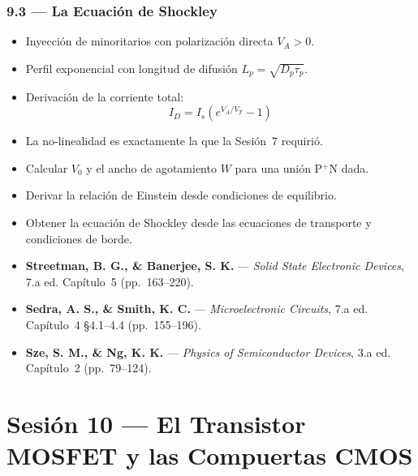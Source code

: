 \documentclass[11pt, letterpaper]{article}
\begin{document}
\subsubsection{9.3 --- La Ecuaci\'on de Shockley}
\begin{itemize}
  \item Inyecci\'on de minoritarios con polarizaci\'on directa $V_A>0$.
  \item Perfil exponencial con longitud de difusi\'on $L_p=\sqrt{D_p\tau_p}$.
  \item Derivaci\'on de la corriente total:
    \[I_D=I_s\left(e^{V_A/V_T}-1\right)\]
  \item La no-linealidad es exactamente la que la Sesi\'on~7 requiri\'o.
\end{itemize}

\begin{objetivos}
\begin{itemize}
  \item Calcular $V_0$ y el ancho de agotamiento $W$ para una uni\'on P$^+$N dada.
  \item Derivar la relaci\'on de Einstein desde condiciones de equilibrio.
  \item Obtener la ecuaci\'on de Shockley desde las ecuaciones de transporte y condiciones de borde.
\end{itemize}
\end{objetivos}

\begin{lecturas}
\begin{itemize}
  \item[$(\star)$] \textbf{Streetman, B. G., \& Banerjee, S. K.} --- \emph{Solid State Electronic Devices}, 7.a ed. Cap\'itulo~5 (pp.\ 163--220).
  \item[$(\star)$] \textbf{Sedra, A. S., \& Smith, K. C.} --- \emph{Microelectronic Circuits}, 7.a ed. Cap\'itulo~4 \S4.1--4.4 (pp.\ 155--196).
  \item \textbf{Sze, S. M., \& Ng, K. K.} --- \emph{Physics of Semiconductor Devices}, 3.a ed. Cap\'itulo~2 (pp.\ 79--124).
\end{itemize}
\end{lecturas}

\newpage

\section{Sesi\'on 10 --- El Transistor MOSFET y las Compuertas CMOS}
\end{document}

